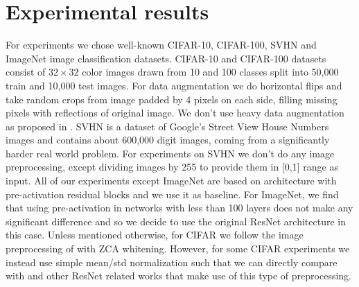 \documentclass{bmvc2k}
\begin{document}
\vspace{-0.2cm}
\section{Experimental results}

For experiments we chose well-known CIFAR-10, CIFAR-100, SVHN and ImageNet image classification datasets. CIFAR-10 and CIFAR-100 datasets \cite{cifar10} consist of $32\times32$ color images drawn from 10 and 100 classes split into 50,000 train and 10,000 test images. For data augmentation we do horizontal flips and take random crops from image padded by 4 pixels on each side, filling missing pixels with reflections of original image. We don't use heavy data augmentation as proposed in \cite{fmp}. SVHN is a dataset of Google's Street View House Numbers images and contains about 600,000 digit images, coming from a significantly harder real world problem. For experiments on SVHN we don't do any image preprocessing, except dividing images by 255 to provide them in [0,1] range as input. All of our experiments except ImageNet are based on \cite{basicblock2} architecture with pre-activation residual blocks and we use it as baseline. For ImageNet, we find that using pre-activation in networks with less than 100 layers does not make any significant difference and so we decide to use the original ResNet architecture in this case.
 Unless mentioned otherwise, for CIFAR we follow the  image preprocessing of \cite{maxout} with ZCA whitening. However, for some CIFAR  experiments  we   instead   use simple mean/std normalization such that we can directly compare with  \cite{basicblock2} and other ResNet related works that make use of this type of preprocessing.
\end{document}
